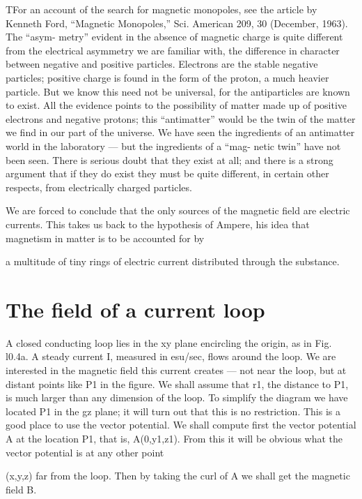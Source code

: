 {TFor an account of the search for magnetic monopoles, see the article by Kenneth
Ford, ``Magnetic Monopoles,'' Sci. American 209, 30 (December, 1963). The ``asym-
metry'' evident in the absence of magnetic charge is quite different from the electrical
asymmetry we are familiar with, the difference in character between negative and
positive particles. Electrons are the stable negative particles; positive charge is found
in the form of the proton, a much heavier particle. But we know this need not be
universal, for the antiparticles are known to exist. All the evidence points to the possibility
of matter made up of positive electrons and negative protons; this ``antimatter''
would be the twin of the matter we find in our part of the universe. We have seen the
ingredients of an antimatter world in the laboratory --- but the ingredients of a ``mag-
netic twin'' have not been seen. There is serious doubt that they exist at all; and
there is a strong argument that if they do exist they must be quite different, in certain
other respects, from electrically charged particles.

We are forced to conclude that the only sources of the magnetic
field are electric currents. This takes us back to the hypothesis of
Ampere, his idea that magnetism in matter is to be accounted for by

a multitude of tiny rings of electric current distributed through the
substance.

\section{The field of a current loop}

A closed conducting loop lies in the xy plane encircling the origin,
as in Fig. l0.4a. A steady current I, measured in esu/sec, flows
around the loop. We are interested in the magnetic field this current
creates --- not near the loop, but at distant points like P1 in the figure.
We shall assume that r1, the distance to P1, is much larger than any
dimension of the loop. To simplify the diagram we have located P1
in the gz plane; it will turn out that this is no restriction. This is a
good place to use the vector potential. We shall compute first the
vector potential A at the location P1, that is, A(0,y1,z1). From this
it will be obvious what the vector potential is at any other point

(x,y,z) far from the loop. Then by taking the curl of A we shall get
the magnetic field B.

}
